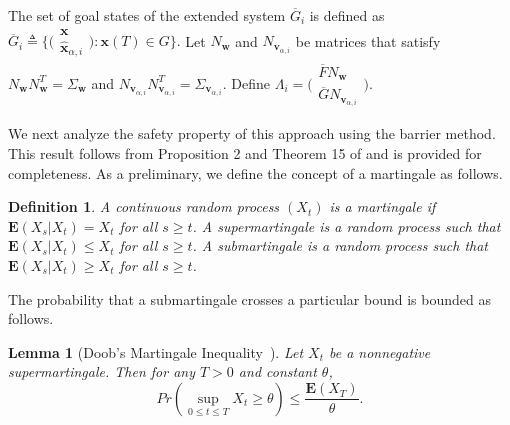 \documentclass[journal]{IEEEtran}
\newtheorem{Lemma}{Lemma}
\newtheorem{Definition}{Definition}
\begin{document}
The set of goal states of the extended system $\overline{G}_i$ is defined as 
$\overline{G}_i \triangleq \{\big(
\begin{smallmatrix}
\mathbf{x} \\
\hat{\mathbf{x}}_{\alpha,i}
\end{smallmatrix}
\big): \mathbf{x}(T) \in G\}.$
Let $N_{\mathbf{w}}$ and $N_{\mathbf{v}_{\alpha,i}}$ be matrices that satisfy $N_{\mathbf{w}}N_{\mathbf{w}}^{T} = \Sigma_{\mathbf{w}}$ and $N_{\mathbf{v}_{\alpha,i}}N_{\mathbf{v}_{\alpha,i}}^{T} = \Sigma_{\mathbf{v}_{\alpha,i}}$. Define $\Lambda_i = \big(
\begin{smallmatrix}
\overline{F}N_{\mathbf{w}} \\
\overline{G} N_{\mathbf{v}_{\alpha,i}}
\end{smallmatrix}
\big).$

We next analyze the safety property of this approach using the barrier method. This result follows from Proposition 2 and Theorem 15 of \cite{prajna2007framework} and is provided for completeness. As a preliminary, we define the concept of a martingale as follows.

\begin{Definition}
\label{def:martingale}
A continuous random process $(X_{t})$ is a \emph{martingale} if $\mathbf{E}(X_{s} | X_{t}) = X_{t}$ for all $s \geq t$. A \emph{supermartingale} is a random process such that $\mathbf{E}(X_{s} | X_{t}) \leq X_{t}$ for all $s \geq t$. A \emph{submartingale} is a random process such that $\mathbf{E}(X_{s} | X_{t}) \geq X_{t}$ for all $s \geq t$.
\end{Definition}

The probability that a submartingale crosses a particular bound is bounded as follows.

\begin{Lemma}[Doob's Martingale Inequality~\cite{karatzsas1991brownian}]
\label{lemma:doob_martingale}
Let $X_{t}$ be a nonnegative supermartingale. Then for any $T > 0$ and constant $\theta$, $$Pr\left(\sup_{0 \leq t \leq T}{X_{t}} \geq \theta\right) \leq \frac{\mathbf{E}(X_{T})}{\theta}.$$
\end{Lemma}
 
\end{document}
